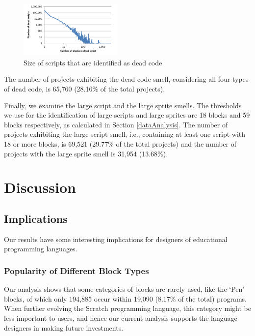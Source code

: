\documentclass{sig-alternate}
\begin{document}
\begin{figure}
	\centering
	\includegraphics[width=0.45\textwidth]{fig/charts/12deadcode}
	\caption{Size of scripts that are identified as dead code}
	\label{fig:deadcode}
\end{figure}

The number of projects exhibiting the dead code smell, considering all four types of dead code, is 65,760 (28.16\% of the total projects).

Finally, we examine the large script and the large sprite smells. The thresholds we use for the identification of large scripts and large sprites are 18 blocks and 59 blocks respectively, as calculated in Section \ref{dataAnalysis}. The number of projects exhibiting the large script smell, i.e., containing at least one script with 18 or more blocks, is 69,521 (29.77\% of the total projects) and the number of projects with the large sprite smell is 31,954 (13.68\%).

\noindent
{}


\section{Discussion}
\label{sec:discussion}
\subsection{Implications}
Our results have some interesting implications for designers of educational programming languages. 



\subsubsection{Popularity of Different Block Types}
Our analysis shows that some categories of blocks are rarely used, like the `Pen' blocks, of which only 194,885 occur within 19,090 (8.17\% of the total) programs. When further evolving the Scratch programming language, this category might be less important to users, and hence our current analysis supports the language designers in making future investments.
\end{document}
